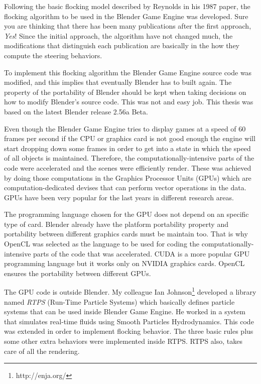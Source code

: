 Following the basic flocking model described by Reynolds in his 1987 paper, the flocking algorithm to be used in the Blender Game Engine was developed. Sure you are thinking that there has been many publications after the first approach, \textit{Yes}!  Since the initial approach, the algorithm have not changed much, the modifications that distinguish each publication are basically in the how they compute the steering behaviors.

To implement this flocking algorithm the Blender Game Engine source code was modified, and this implies that eventually Blender has to built again. The property of the portability of Blender should be kept when taking decisions on how to modify Blender's source code. This was not and easy job. This thesis was based on the latest Blender release 2.56a Beta. 


Even though the Blender Game Engine tries to display games at a speed of 60 frames per second\cite{bookGameKit2} if the CPU or graphics card is not good enough the engine will start dropping down some frames in order to get into a state in which the speed of all objects is maintained. Therefore, the computationally-intensive parts of the code were accelerated and the scenes were efficiently render. These was achieved by doing those computations in the Graphics Processor Units (GPUs) which are computation-dedicated devises that can perform vector operations in the data. GPUs have been very popular for the last years in different research areas. 

The programming language chosen for the GPU does not depend on an specific type of card. Blender already have the platform portability property and portability between different graphics cards must be maintain too. That is why OpenCL was selected as the language to be used for coding the computationally-intensive parts of the code that was accelerated. CUDA is a more popular GPU programming language but it works only on NVIDIA graphics cards. OpenCL ensures the portability between different GPUs.


The GPU code is outside Blender. My colleague Ian Johnson\footnote{http://enja.org/} developed a library named \textit{RTPS} (Run-Time Particle Systems) which basically defines particle systems that can be used inside Blender Game Engine. He worked in a system that simulates real-time fluids using Smooth Particles Hydrodynamics. This code was extended in order to implement flocking behavior. The three basic rules plus some other extra behaviors were implemented inside RTPS. RTPS also, takes care of all the rendering.

